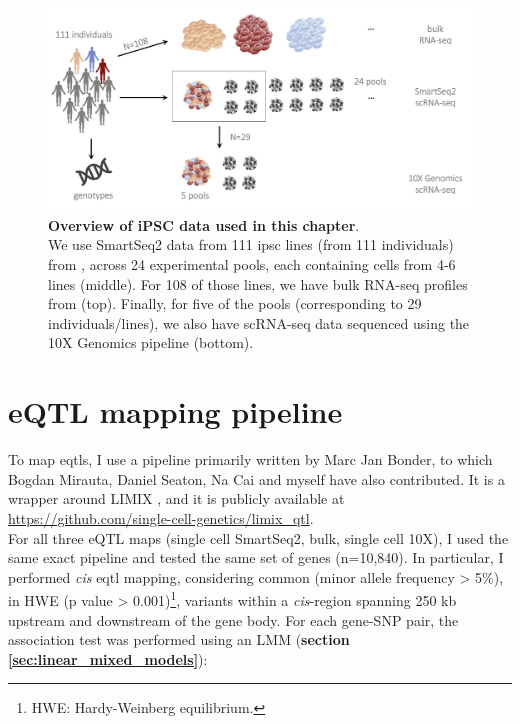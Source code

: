 \begin{figure}[h]
\centering
\includegraphics[width=14cm]{Chapter3/Fig/ips_data.png}
\caption[iPSC data]{\textbf{Overview of iPSC data used in this chapter}.\\
We use SmartSeq2 \cite{purcell2007plink} data from 111 \gls{ipsc} lines (from 111 individuals) from \cite{cuomo2020single}, across 24 experimental pools, each containing cells from 4-6 lines (middle).
For 108 of those lines, we have bulk RNA-seq profiles from \cite{mirauta2018population} (top).
Finally, for five of the pools (corresponding to 29 individuals/lines), we also have scRNA-seq data sequenced using the 10X Genomics pipeline \cite{zheng2017massively} (bottom).}
\label{fig:ipsc_data}
\end{figure}

\section{eQTL mapping pipeline}

To map \glspl{eqtl}, I use a pipeline primarily written by Marc Jan Bonder, to which Bogdan Mirauta, Daniel Seaton, Na Cai and myself have also contributed. 
It is a wrapper around LIMIX \cite{lippert2014limix, casale2015efficient}, and it is publicly available at \url{https://github.com/single-cell-genetics/limix_qtl}. \\

For all three eQTL maps (single cell SmartSeq2, bulk, single cell 10X), I used the same exact pipeline and tested the same set of genes (n=10,840).
In particular, I performed \textit{cis} \gls{eqtl} mapping, considering common (minor allele frequency > 5\%), in HWE (p value > 0.001)\footnote{HWE: Hardy-Weinberg equilibrium.}, variants within a \textit{cis}-region spanning 250 kb upstream and downstream of the gene body.
For each gene-SNP pair, the association test was performed using an LMM (\textbf{section
\ref{sec:linear_mixed_models}}):

